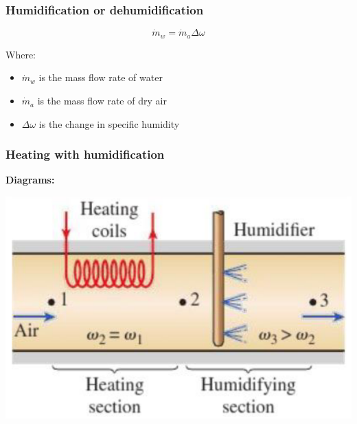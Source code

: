 \documentclass[11pt]{article}
\begin{document}
\subsubsection{Humidification or dehumidification}
\label{sec:org797bd1c}
\[\dot{m}_w = \dot{m}_a \Delta \omega\]

Where:
\begin{itemize}
\item \(\dot{m}_w\) is the mass flow rate of water
\item \(\dot{m}_a\) is the mass flow rate of dry air
\item \(\Delta \omega\) is the change in specific humidity
\end{itemize}
\subsubsection{Heating with humidification}
\label{sec:org9d657cf}
\textbf{Diagrams:}
\begin{center}
\includegraphics[scale=0.6]{./images/heating-with-humidification-diagram.png}
\end{center}
\end{document}
